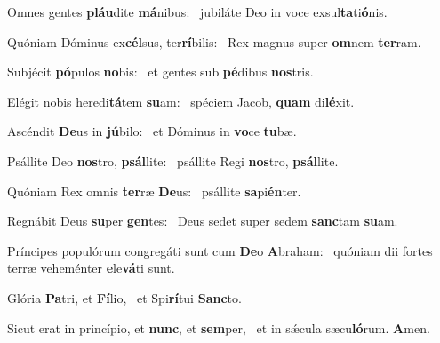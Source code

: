 \item Omnes gentes \textbf{pláu}dite \textbf{má}nibus:~\psstar{} jubiláte Deo in voce exsul\textbf{ta}ti\textbf{ó}nis.
\item Quóniam Dóminus ex\textbf{cél}sus, ter\textbf{rí}bilis:~\psstar{} Rex magnus super \textbf{om}nem \textbf{ter}ram.
\item Subjécit \textbf{pó}pulos \textbf{no}bis:~\psstar{} et gentes sub \textbf{pé}dibus \textbf{nos}tris.
\item Elégit nobis heredi\textbf{tá}tem \textbf{su}am:~\psstar{} spéciem Jacob, \textbf{quam} di\textbf{lé}xit.
\item Ascéndit \textbf{De}us in \textbf{jú}bilo:~\psstar{} et Dóminus in \textbf{vo}ce \textbf{tu}bæ.
\item Psállite Deo \textbf{nos}tro, \textbf{psál}lite:~\psstar{} psállite Regi \textbf{nos}tro, \textbf{psál}lite.
\item Quóniam Rex omnis \textbf{ter}ræ \textbf{De}us:~\psstar{} psállite \textbf{sa}pi\textbf{én}ter.
\item Regnábit Deus \textbf{su}per \textbf{gen}tes:~\psstar{} Deus sedet super sedem \textbf{sanc}tam \textbf{su}am.
\item Príncipes populórum congre\-gáti sunt cum \textbf{De}o \textbf{A}braham:~\psstar{} quóniam dii fortes terræ veheménter \textbf{e}le\textbf{vá}ti sunt.
\item Glória \textbf{Pa}tri, et \textbf{Fí}lio,~\psstar{} et Spi\textbf{rí}tui \textbf{Sanc}to.
\item Sicut erat in princípio, et \textbf{nunc}, et \textbf{sem}per,~\psstar{} et in sǽcula sæcu\textbf{ló}rum. \textbf{A}men.
